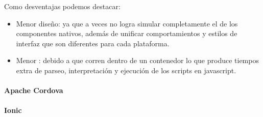 Como desventajas podemos destacar:
\begin{itemize}
\item Menor diseño: ya que a veces no logra simular completamente el  de los componentes nativos, además de unificar comportamientos y estilos de interfaz que son diferentes para cada plataforma.
\item Menor : debido a que corren dentro de un contenedor lo que produce tiempos extra de parseo, interpretación y ejecución de los scripts en \gls{javascript}.
\end{itemize}

\paragraph{Apache Cordova}
\label{cordova}

\paragraph{Ionic}
\label{ionic}